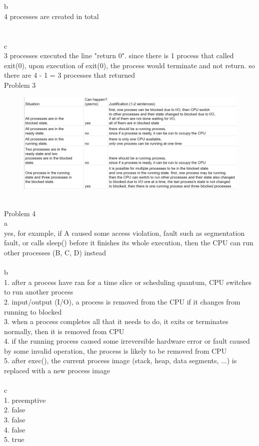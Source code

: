 \documentclass[12pt, border = 4pt, multi]{article} %
\begin{document}
\\
\\
b\\
4 processes are created in total\\
\\
\\
c\\
3 processes executed the line "return 0". since there is 1 process that called exit(0), upon execution of exit(0), the process would terminate and not return. so there are 4 - 1 = 3 processes that returned\\
\newpage
\noindent
Problem 3
\begin{figure}[h!]
	\centering
	\includegraphics[width = 1.1\textwidth, height = 0.7\textwidth]{3} %
\end{figure}\\
\newpage
\noindent
Problem 4\\
a\\
yes, for example, if A caused some access violation, fault such as segmentation fault, or calls sleep() before it finishes its whole execution, then the CPU can run other processes (B, C, D) instead\\
\\
b\\
1. after a process have ran for a time slice or scheduling quantum, CPU switches to run another process\\
2. input/output (I/O), a process is removed from the CPU if it changes from running to blocked\\
3. when a process completes all that it needs to do, it exits or terminates normally, then it is removed from CPU\\
4. if the running process caused some irreversible hardware error or fault caused by some invalid operation, the process is likely to be removed from CPU\\
5. after exec(), the current process image (stack, heap, data segments, ...) is replaced with a new process image\\
\\
c\\
1. preemptive\\
2. false\\
3. false\\
4. false\\
5. true
\end{document}
